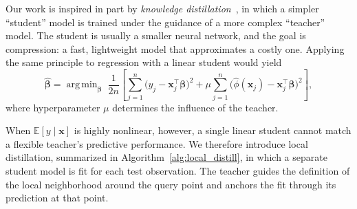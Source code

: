 \documentclass[12pt]{article}
\newcommand{\EE}{\mathbb{E}}
\DeclareMathOperator*{\argmin}{arg\,min}
\theoremstyle{definition}
\begin{document}
Our work is inspired in part by \textit{knowledge distillation}~\cite{hinton2015distilling}, in which a simpler ``student'' model is trained under the guidance of a more complex ``teacher'' model.
The student is usually a smaller neural network, and the goal is compression: a fast, lightweight model that approximates a costly one. 
Applying the same principle to regression with a linear student would yield 
\begin{equation}
\hat{\bm\beta} = \argmin_{\bm\beta} \; \frac{1}{2 n} \left[\sum_{j=1}^{n} \bigl(y_j - \bm{x}_j^\top \bm\beta\bigr)^2 + \mu \sum_{j=1}^{n} \bigl(\hat\phi(\bm{x}_j) - \bm{x}_j^\top \bm\beta\bigr)^2\right],
\label{eq:general}
\end{equation}
where hyperparameter $\mu$ determines the influence of the teacher. 

When $\EE[y \mid \bm{x}]$ is highly nonlinear, however, a single linear student cannot match a flexible teacher's predictive performance.
We therefore introduce local distillation, summarized in Algorithm~\ref{alg:local_distill}, in which a separate student model is fit for each test observation. 
The teacher guides the definition of the local neighborhood around the query point and anchors the fit through its prediction at that point.
\end{document}
